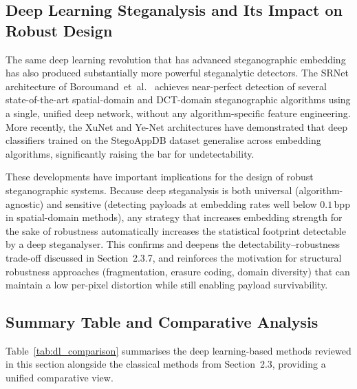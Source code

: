 \documentclass[12pt,a4paper,oneside]{report}
\begin{document}
	\subsection{Deep Learning Steganalysis and Its Impact on Robust Design}
	\label{subsec:dl_steganalysis}
	
	The same deep learning revolution that has advanced steganographic embedding has also produced
	substantially more powerful steganalytic detectors. The SRNet architecture of Boroumand~et~al.\
	\cite{boroumand2019deep} achieves near-perfect detection of several state-of-the-art spatial-domain
	and DCT-domain steganographic algorithms using a single, unified deep network, without any
	algorithm-specific feature engineering. More recently, the XuNet \cite{xu2016structural} and
	Ye-Net \cite{yedroudj2018yenet} architectures have demonstrated that deep classifiers trained on
	the StegoAppDB dataset generalise across embedding algorithms, significantly raising the bar for
	undetectability.
	
	These developments have important implications for the design of robust steganographic systems.
	Because deep steganalysis is both universal (algorithm-agnostic) and sensitive (detecting payloads
	at embedding rates well below $0.1$\,bpp in spatial-domain methods), any strategy that increases
	embedding strength for the sake of robustness automatically increases the statistical footprint
	detectable by a deep steganalyser. This confirms and deepens the detectability--robustness
	trade-off discussed in Section~2.3.7, and reinforces the motivation for structural robustness
	approaches (fragmentation, erasure coding, domain diversity) that can maintain a low per-pixel
	distortion while still enabling payload survivability.
	
	\subsection{Summary Table and Comparative Analysis}
	\label{subsec:dl_summary_table}
	
	Table~\ref{tab:dl_comparison} summarises the deep learning-based methods reviewed in this
	section alongside the classical methods from Section~2.3, providing a unified comparative view.
	
\end{document}
